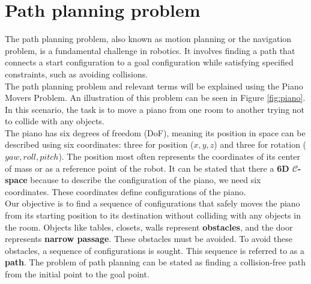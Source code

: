 \documentclass{ctuthesis}
\begin{document}
\section{Path planning problem}
The path planning problem, also known as motion planning or the navigation problem, 
is a fundamental challenge in robotics. 
It involves finding a path that connects a start configuration to a goal configuration while 
satisfying specified constraints, such as avoiding collisions.\\[12pt]
The path planning problem and relevant terms will be explained using the Piano Movers Problem.
An illustration of this problem can be seen in Figure \ref{fig:piano}. 
In this scenario, the task is to move a piano from one room to another trying 
not to collide with any objects.\\[12pt]
The piano has six degrees of freedom (DoF), 
meaning its position in space can be described using six coordinates: three for position ($x, y, z$) 
and three for rotation ($yaw, roll, pitch$). 
The position most often represents the coordinates of its center of mass or as a reference point of the robot.
It can be stated that there a \textbf{6D $\mathcal{C}$-space} because to describe the configuration of the piano, we need six coordinates.
These coordinates define configurations of the piano.\\[12pt]
Our objective is to find a sequence of configurations that safely moves the piano 
from its starting position to its destination without colliding with any objects in the room.
Objects like tables, closets, walls represent \textbf{obstacles}, and the door represents \textbf{narrow passage}. 
These obstacles must be avoided. 
To avoid these obstacles, a sequence of configurations is sought. 
This sequence is referred to as a \textbf{path}. 
The problem of path planning can be stated as finding a collision-free path 
from the initial point to the goal point.
\end{document}
